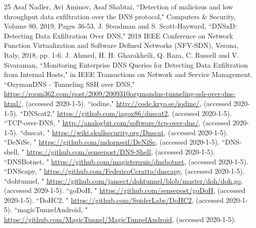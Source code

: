 \documentclass[12pt]{jarticle} %
\begin{document}
\begin{thebibliography} {25}
  Asaf Nadler, Avi Aminov, Asaf Shabtai, ``Detection of malicious and low throughput data exfiltration over the DNS protocol," Computers \& Security, Volume 80, 2019, Pages 36-53.
  J. Steadman and S. Scott-Hayward, ``DNSxD: Detecting Data Exfiltration Over DNS," 2018 IEEE Conference on Network Function Virtualization and Software Defined Networks (NFV-SDN), Verona, Italy, 2018, pp. 1-6.
  J. Ahmed, H. H. Gharakheili, Q. Raza, C. Russell and V. Sivaraman, ``Monitoring Enterprise DNS Queries for Detecting Data Exfiltration from Internal Hosts," in IEEE Transactions on Network and Service Management.
  ``OzymanDNS - Tunneling SSH over DNS," \href{https://room362.com/post/2009/2009310ozymandns-tunneling-ssh-over-dns-html/}{https://room362.com/post/2009/2009310ozymandns-tunneling-ssh-over-dns-html/}, (accessed 2020-1-5).
  ``iodine," \href{http://code.kryo.se/iodine/}{http://code.kryo.se/iodine/}, (accessed 2020-1-5).
  ``DNScat2," \href{https://github.com/iagox86/dnscat2}{https://github.com/iagox86/dnscat2}, (accessed 2020-1-5).
  ``TCP-over-DNS, " \href{http://analogbit.com/software/tcp-over-dns/}{http://analogbit.com/software/tcp-over-dns/}, (accessed 2020-1-5).
  ``dnscat, " \href{https://wiki.skullsecurity.org/Dnscat}{https://wiki.skullsecurity.org/Dnscat}, (accessed 2020-1-5).
  ``DeNiSe, " \href{https://github.com/mdornseif/DeNiSe}{https://github.com/mdornseif/DeNiSe}, (accessed 2020-1-5).
  ``DNS-shell, " \href{https://github.com/sensepost/DNS-Shell}{https://github.com/sensepost/DNS-Shell}, (accessed 2020-1-5).
  ``DNSBotnet, " \href{https://github.com/magisterquis/dnsbotnet}{https://github.com/magisterquis/dnsbotnet}, (accessed 2020-1-5).
  ``DNScapy, " \href{https://github.com/FedericoCeratto/dnscapy}{https://github.com/FedericoCeratto/dnscapy}, (accessed 2020-1-5).
  ``dohtunnel, " \href{https://github.com/jansect/dohtunnel/blob/master/doh/doh.go}{https://github.com/jansect/dohtunnel/blob/master/doh/doh.go}, (accessed 2020-1-5).
  ``goDoH, " \href{https://github.com/sensepost/goDoH}{https://github.com/sensepost/goDoH}, (accessed 2020-1-5).
  ``DoHC2, " \href{https://github.com/SpiderLabs/DoHC2}{https://github.com/SpiderLabs/DoHC2}, (accessed 2020-1-5).
  ``magicTunnelAndroid, " \href{https://github.com/MagicTunnel/MagicTunnelAndroid}{https://github.com/MagicTunnel/MagicTunnelAndroid}, (accessed 2020-1-5).

\end{thebibliography}
\end{document}

